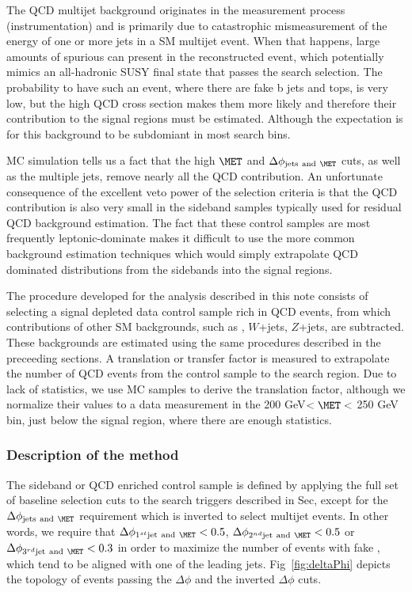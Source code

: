 %
%

The QCD multijet background originates in the measurement process (instrumentation) and is primarily due to catastrophic mismeasurement of the energy of one or more jets in a SM multijet event. When that happens, large amounts of spurious \MET can present in the reconstructed event, which potentially mimics an all-hadronic SUSY final state that passes the search selection. The probability to have such an event, where there are fake b jets and tops, is very low, but the high QCD cross section makes them more likely and therefore their contribution to the signal regions must be estimated. Although the expectation is for this background to be subdomiant in most search bins.

MC simulation tells us a fact that the high $\MET$ and
$\Delta\phi_{\mathrm{jets~and}~\MET}$ cuts, as well as the multiple jets, 
remove nearly all the QCD contribution. An unfortunate consequence of the excellent veto power of the selection
criteria is that the QCD contribution is also very small 
in the sideband samples typically used for residual QCD background 
estimation. The fact that these control samples are most frequently 
leptonic-\ttbar dominate makes it difficult to use the more common background 
estimation techniques which would simply extrapolate QCD dominated distributions 
from the sidebands into the signal regions. 

The procedure developed for the analysis described in this note consists
of selecting a signal depleted data control sample rich in QCD events, 
from which contributions of other SM backgrounds, such as \ttbar, $W$+jets, 
$Z$+jets, are subtracted. These backgrounds
are estimated using the same procedures described in the preceeding sections.  
A translation or transfer factor is measured to extrapolate the
number of QCD events from the control sample to the 
search region. Due to lack of statistics, we use MC samples to
derive the translation factor, although we normalize their values to a 
data measurement in the 200 GeV$<\MET<$ 250 GeV bin, just below the 
signal region, where there are enough statistics.

\subsubsection{Description of the method}

The sideband or QCD enriched control sample is defined by applying 
the full set of baseline selection cuts to the search triggers described
in Sec, except for the $\Delta\phi_{\mathrm{jets~and}~\MET}$ 
requirement which is inverted to select multijet events. In other words,
we require that
$\Delta\phi_{1^{st}\mathrm{jet~and}~\MET} < 0.5$, 
$\Delta\phi_{2^{nd} \mathrm{jet~and}~\MET} < 0.5$ or 
$\Delta\phi_{3^{rd} \mathrm{jet~and}~\MET} < 0.3$ in order to maximize the 
number of events with fake \MET, which tend to be aligned with one of the 
leading jets.
Fig~\ref{fig:deltaPhi} depicts the topology of events passing the 
$\Delta\phi$ and the inverted $\Delta\phi$ cuts.

